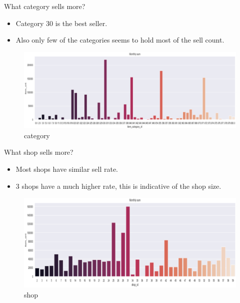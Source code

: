 \documentclass[
 size=14pt,
 paper=smartboard,  %
 mode=present, 		%
 display=slides, 	%
 style=tuliplab,  	%
 pauseslide,
 fleqn,leqno]{powerdot}
\begin{document}
\begin{slide}[toc=,bm=]{}
  \twocolumn
  {
    What category sells more?
  \begin{itemize}
  \item
  \smallskip
  Category 30 is the best seller.
  \item
  Also only few of the categories seems to hold most of the sell count.
 \end{itemize}
  \vspace{0.75cm}
  \begin{figure}
    \centering
    \includegraphics[width=1.0\textwidth,natwidth=1185,natheight=425]{figures/catg.eps}
    \caption{category}\label{Checking for outliers}
  \end{figure}
  }
  {
    What shop sells more?
  \begin{itemize}
  \item
  Most shops have similar sell rate.
  
  \item
   3 shops have a much higher rate, this is indicative of the shop size.
  \end{itemize}
  \bigskip
  \begin{figure}
    \centering
    \includegraphics[width=1.0\textwidth,natwidth=1193,natheight=536]{figures/shop.eps}
    \caption{shop}\label{Checking for outliers}
  \end{figure}
  }
  

\end{slide}
\end{document}
